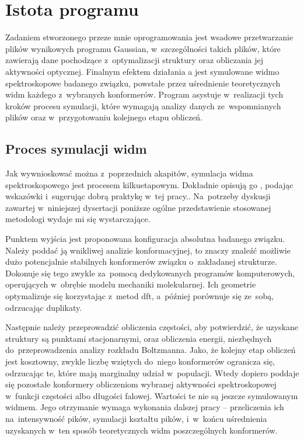 \section{Istota programu}\label{tesliper:essence}
Zadaniem stworzonego przeze mnie oprogramowania jest wsadowe przetwarzanie plików wynikowych
  programu Gaussian, w~szczególności takich plików, które zawierają
  dane pochodzące z~optymalizacji struktury oraz obliczania jej aktywności optycznej.
Finalnym efektem działania \tesliper{}a jest symulowane widmo spektroskopowe badanego związku,
  powstałe przez uśrednienie teoretycznych widm każdego z~wybranych konformerów.
Program asystuje w~realizacji tych kroków procesu symulacji, które wymagają analizy danych
  ze~wspomnianych plików oraz w~przygotowaniu kolejnego etapu obliczeń.

\subsection{Proces symulacji widm}\label{essence:simulation}
Jak wywnioskować można z~poprzednich akapitów, symulacja widma spektroskopowego jest
  procesem kilkuetapowym.
Dokładnie opisują go \citeauthor{pescitelli16}, podając wskazówki i~sugerując dobrą
  praktykę w~tej pracy..
Na~potrzeby dyskusji zawartej w~niniejszej dysertacji poniższe ogólne przedstawienie
  stosowanej metodologi wydaje mi się wystarczające.

Punktem wyjścia jest proponowana konfiguracja absolutna badanego związku.
Należy poddać ją wnikliwej analizie konformacyjnej, to znaczy znaleźć możliwie dużo
  potencjalnie stabilnych konformerów związku o~zakładanej strukturze.
Dokonuje się tego zwykle za~pomocą dedykowanych programów komputerowych, operujących w~obrębie
  modelu mechaniki molekularnej.
Ich geometrie optymalizuje się korzystając z~metod \gls{dft}, a~później porównuje się ze~sobą,
  odrzucając duplikaty.

Następnie należy przeprowadzić obliczenia częstości, aby potwierdzić, że uzyskane
  struktury są punktami stacjonarnymi, oraz obliczenia energii, niezbędnych do~przeprowadzenia
  analizy rozkładu Boltzmanna.
Jako, że kolejny etap obliczeń jest kosztowny,
  zwykle liczbę wziętych do~niego konformerów ogranicza się, odrzucając te, które mają marginalny
  udział w~populacji.
Wtedy dopiero poddaje się pozostałe konformery obliczeniom wybranej aktywności spektroskopowej
  w~funkcji częstości albo długości falowej.
Wartości te nie są jeszcze symulowanym widmem.
Jego otrzymanie wymaga wykonania dalszej pracy \--- przeliczenia ich na~intensywność pików,
  symulacji kształtu pików, i~w~końcu uśrednienia uzyskanych w~ten sposób teoretycznych widm
  poszczególnych konformerów.


